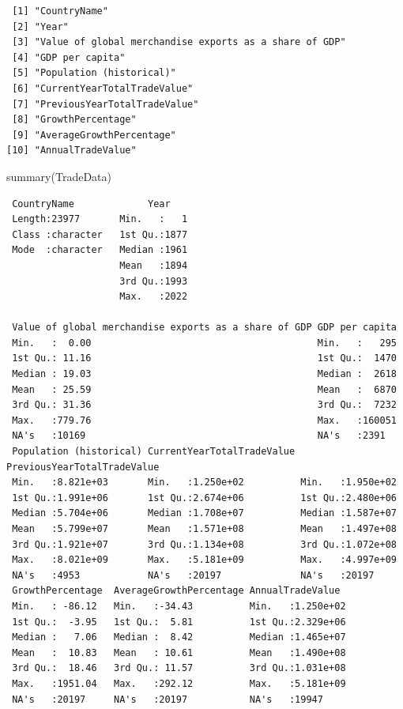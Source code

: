\documentclass[
  10pt,
]{article}
\newenvironment{Shaded}{\begin{snugshade}}{\end{snugshade}}
\newcommand{\FunctionTok}[1]{\textcolor[rgb]{0.28,0.35,0.67}{#1}}
\newcommand{\NormalTok}[1]{\textcolor[rgb]{0.00,0.23,0.31}{#1}}
\begin{document}
\begin{verbatim}
 [1] "CountryName"                                          
 [2] "Year"                                                 
 [3] "Value of global merchandise exports as a share of GDP"
 [4] "GDP per capita"                                       
 [5] "Population (historical)"                              
 [6] "CurrentYearTotalTradeValue"                           
 [7] "PreviousYearTotalTradeValue"                          
 [8] "GrowthPercentage"                                     
 [9] "AverageGrowthPercentage"                              
[10] "AnnualTradeValue"                                     
\end{verbatim}

\begin{Shaded}
\begin{Highlighting}[]
\FunctionTok{summary}\NormalTok{(TradeData)}
\end{Highlighting}
\end{Shaded}

\begin{verbatim}
 CountryName             Year     
 Length:23977       Min.   :   1  
 Class :character   1st Qu.:1877  
 Mode  :character   Median :1961  
                    Mean   :1894  
                    3rd Qu.:1993  
                    Max.   :2022  
                                  
 Value of global merchandise exports as a share of GDP GDP per capita  
 Min.   :  0.00                                        Min.   :   295  
 1st Qu.: 11.16                                        1st Qu.:  1470  
 Median : 19.03                                        Median :  2618  
 Mean   : 25.59                                        Mean   :  6870  
 3rd Qu.: 31.36                                        3rd Qu.:  7232  
 Max.   :779.76                                        Max.   :160051  
 NA's   :10169                                         NA's   :2391    
 Population (historical) CurrentYearTotalTradeValue PreviousYearTotalTradeValue
 Min.   :8.821e+03       Min.   :1.250e+02          Min.   :1.950e+02          
 1st Qu.:1.991e+06       1st Qu.:2.674e+06          1st Qu.:2.480e+06          
 Median :5.704e+06       Median :1.708e+07          Median :1.587e+07          
 Mean   :5.799e+07       Mean   :1.571e+08          Mean   :1.497e+08          
 3rd Qu.:1.921e+07       3rd Qu.:1.134e+08          3rd Qu.:1.072e+08          
 Max.   :8.021e+09       Max.   :5.181e+09          Max.   :4.997e+09          
 NA's   :4953            NA's   :20197              NA's   :20197              
 GrowthPercentage  AverageGrowthPercentage AnnualTradeValue   
 Min.   : -86.12   Min.   :-34.43          Min.   :1.250e+02  
 1st Qu.:  -3.95   1st Qu.:  5.81          1st Qu.:2.329e+06  
 Median :   7.06   Median :  8.42          Median :1.465e+07  
 Mean   :  10.83   Mean   : 10.61          Mean   :1.490e+08  
 3rd Qu.:  18.46   3rd Qu.: 11.57          3rd Qu.:1.031e+08  
 Max.   :1951.04   Max.   :292.12          Max.   :5.181e+09  
 NA's   :20197     NA's   :20197           NA's   :19947      
\end{verbatim}
\end{document}
